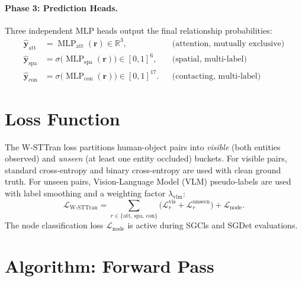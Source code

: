 \documentclass{article}
\newcommand{\mR}{\mathbb{R}}
\newcommand{\op}[1]{\operatorname{#1}}
\newcommand{\mat}[1]{\bm{#1}}
\begin{document}
\paragraph{Phase 3: Prediction Heads.} Three independent MLP heads output the final relationship probabilities:
\begin{align}
    \hat{\mat{y}}_{\text{att}} &= \op{MLP}_{\text{att}}(\mat{r}) \in \mR^{3}, & &\text{(attention, mutually exclusive)} \label{eq:att_head} \\
    \hat{\mat{y}}_{\text{spa}} &= \sigma\!\bigl(\op{MLP}_{\text{spa}}(\mat{r})\bigr) \in [0,1]^{6}, & &\text{(spatial, multi-label)} \label{eq:spa_head} \\
    \hat{\mat{y}}_{\text{con}} &= \sigma\!\bigl(\op{MLP}_{\text{con}}(\mat{r})\bigr) \in [0,1]^{17}. & &\text{(contacting, multi-label)} \label{eq:con_head}
\end{align}


\section{Loss Function}
\label{sec:loss}

The W-STTran loss partitions human-object pairs into \emph{visible} (both entities observed) and \emph{unseen} (at least one entity occluded) buckets. For visible pairs, standard cross-entropy and binary cross-entropy are used with clean ground truth. For unseen pairs, Vision-Language Model (VLM) pseudo-labels are used with label smoothing and a weighting factor $\lambda_{\text{vlm}}$:
\begin{equation}
    \mathcal{L}_{\text{W-STTran}} = \sum_{r \in \{\text{att, spa, con}\}} \bigl(\mathcal{L}_{r}^{\text{vis}} + \mathcal{L}_{r}^{\text{unseen}}\bigr) + \mathcal{L}_{\text{node}}.
    \label{eq:total_loss}
\end{equation}
The node classification loss $\mathcal{L}_{\text{node}}$ is active during SGCls and SGDet evaluations.


\section{Algorithm: Forward Pass}
\label{sec:algorithm}
\end{document}
